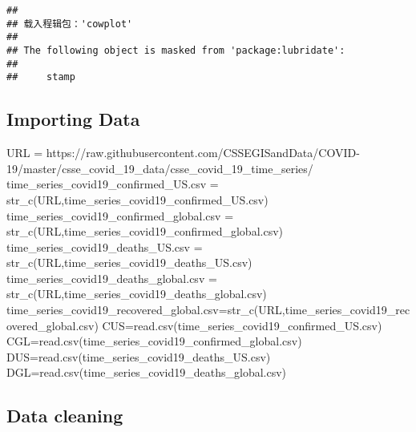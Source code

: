 \documentclass[
]{article}
\newenvironment{Shaded}{\begin{snugshade}}{\end{snugshade}}
\newcommand{\FunctionTok}[1]{\textcolor[rgb]{0.00,0.00,0.00}{#1}}
\newcommand{\NormalTok}[1]{#1}
\newcommand{\OtherTok}[1]{\textcolor[rgb]{0.56,0.35,0.01}{#1}}
\newcommand{\StringTok}[1]{\textcolor[rgb]{0.31,0.60,0.02}{#1}}
\begin{document}
\begin{verbatim}
## 
## 载入程辑包：'cowplot'
## 
## The following object is masked from 'package:lubridate':
## 
##     stamp
\end{verbatim}

\hypertarget{importing-data}{%
\subsection{Importing Data}\label{importing-data}}

\begin{Shaded}
\begin{Highlighting}[]
\NormalTok{URL }\OtherTok{=} \StringTok{\textquotesingle{}https://raw.githubusercontent.com/CSSEGISandData/COVID{-}19/master/csse\_covid\_19\_data/csse\_covid\_19\_time\_series/\textquotesingle{}}
\NormalTok{time\_series\_covid19\_confirmed\_US.csv }\OtherTok{=} \FunctionTok{str\_c}\NormalTok{(URL,}\StringTok{\textquotesingle{}time\_series\_covid19\_confirmed\_US.csv\textquotesingle{}}\NormalTok{)}
\NormalTok{time\_series\_covid19\_confirmed\_global.csv }\OtherTok{=} \FunctionTok{str\_c}\NormalTok{(URL,}\StringTok{\textquotesingle{}time\_series\_covid19\_confirmed\_global.csv\textquotesingle{}}\NormalTok{)}
\NormalTok{time\_series\_covid19\_deaths\_US.csv }\OtherTok{=} \FunctionTok{str\_c}\NormalTok{(URL,}\StringTok{\textquotesingle{}time\_series\_covid19\_deaths\_US.csv\textquotesingle{}}\NormalTok{)}
\NormalTok{time\_series\_covid19\_deaths\_global.csv }\OtherTok{=} \FunctionTok{str\_c}\NormalTok{(URL,}\StringTok{\textquotesingle{}time\_series\_covid19\_deaths\_global.csv\textquotesingle{}}\NormalTok{)}
\NormalTok{time\_series\_covid19\_recovered\_global.csv}\OtherTok{=}\FunctionTok{str\_c}\NormalTok{(URL,}\StringTok{\textquotesingle{}time\_series\_covid19\_recovered\_global.csv\textquotesingle{}}\NormalTok{)}
\NormalTok{CUS}\OtherTok{=}\FunctionTok{read.csv}\NormalTok{(time\_series\_covid19\_confirmed\_US.csv)}
\NormalTok{CGL}\OtherTok{=}\FunctionTok{read.csv}\NormalTok{(time\_series\_covid19\_confirmed\_global.csv)}
\NormalTok{DUS}\OtherTok{=}\FunctionTok{read.csv}\NormalTok{(time\_series\_covid19\_deaths\_US.csv)}
\NormalTok{DGL}\OtherTok{=}\FunctionTok{read.csv}\NormalTok{(time\_series\_covid19\_deaths\_global.csv)}
\end{Highlighting}
\end{Shaded}

\hypertarget{data-cleaning}{%
\subsection{Data cleaning}\label{data-cleaning}}
\end{document}
